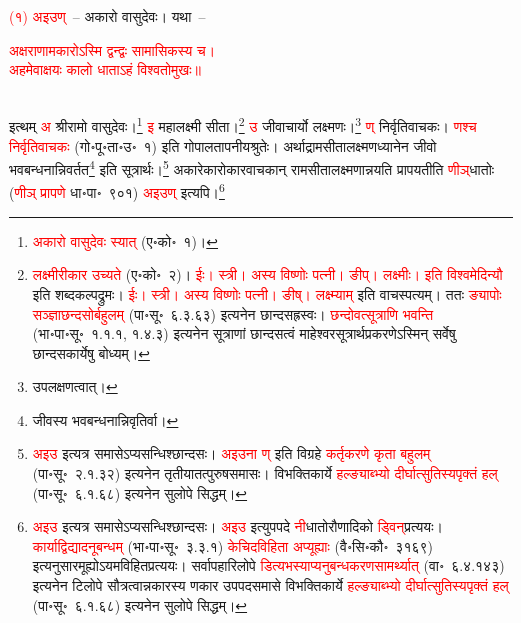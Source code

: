 \begin{sloppypar}\justifying\noindent\hspace{10mm} \textcolor{red}{(१) अइउण्}~– अकारो वासुदेवः। यथा~–\end{sloppypar}
\centering\textcolor{red}{अक्षराणामकारोऽस्मि द्वन्द्वः सामासिकस्य च।\nopagebreak\\
अहमेवाक्षयः कालो धाताऽहं विश्वतोमुखः॥}\nopagebreak\\
\\
\begin{sloppypar}\justifying\noindent इत्थम् \textcolor{red}{अ} श्रीरामो वासुदेवः।\footnote{\textcolor{red}{अकारो वासुदेवः स्यात्} (ए॰को॰~१)।} \textcolor{red}{इ} महालक्ष्मी सीता।\footnote{\textcolor{red}{लक्ष्मीरीकार उच्यते} (ए॰को॰~२)। \textcolor{red}{ईः। स्त्री। अस्य विष्णोः पत्नी। ङीप्। लक्ष्मीः। इति विश्वमेदिन्यौ} इति शब्दकल्पद्रुमः। \textcolor{red}{ईः। स्त्री। अस्य विष्णोः पत्नी। ङीष्। लक्ष्म्याम्} इति वाचस्पत्यम्। ततः \textcolor{red}{ङ्यापोः सञ्ज्ञा\-छन्दसोर्बहुलम्} (पा॰सू॰~६.३.६३) इत्यनेन छान्दस\-ह्रस्वः। \textcolor{red}{छन्दोवत्सूत्राणि भवन्ति} (भा॰पा॰सू॰~१.१.१, १.४.३) इत्यनेन सूत्राणां छान्दसत्वं माहेश्वर\-सूत्रार्थ\-प्रकरणेऽस्मिन् सर्वेषु छान्दस\-कार्येषु बोध्यम्।} \textcolor{red}{उ} जीवाचार्यो लक्ष्मणः।\footnote{उपलक्षणत्वात्।} \textcolor{red}{ण्} निर्वृति\-वाचकः। \textcolor{red}{णश्च निर्वृतिवाचकः} (गो॰पू॰ता॰उ॰~१) इति गोपाल\-तापनीय\-श्रुतेः। अर्थाद्राम\-सीता\-लक्ष्मण\-ध्यानेन जीवो भव\-बन्धनान्निवर्तत\footnote{जीवस्य भव\-बन्धनान्निवृतिर्वा।} इति सूत्रार्थः।\footnote{\textcolor{red}{अइउ} इत्यत्र समासेऽप्यसन्धिश्छान्दसः। \textcolor{red}{अइउना ण्} इति विग्रहे \textcolor{red}{कर्तृकरणे कृता बहुलम्‌} (पा॰सू॰~२.१.३२) इत्यनेन तृतीया\-तत्पुरुष\-समासः। विभक्तिकार्ये \textcolor{red}{हल्ङ्याब्भ्यो दीर्घात्सुतिस्यपृक्तं हल्} (पा॰सू॰~६.१.६८) इत्यनेन सुलोपे सिद्धम्।} अकारेकारोकार\-वाचकान् राम\-सीता\-लक्ष्मणान्नयति प्रापयतीति \textcolor{red}{णीञ्‌}\-धातोः (\textcolor{red}{णीञ् प्रापणे} धा॰पा॰~९०१) \textcolor{red}{अइउण्} इत्यपि।\footnote{\textcolor{red}{अइउ} इत्यत्र समासेऽप्यसन्धिश्छान्दसः। \textcolor{red}{अइउ} इत्युपपदे \textcolor{red}{नी}\-धातोरौणादिको \textcolor{red}{ड्विन्‌}\-प्रत्ययः। \textcolor{red}{कार्याद्विद्यादनूबन्धम्} (भा॰पा॰सू॰~३.३.१) \textcolor{red}{केचिदविहिता अप्यूह्याः} (वै॰सि॰कौ॰~३१६९) इत्यनुसारमूह्योऽ\-यमविहित\-प्रत्ययः। सर्वापहारि\-लोपे \textcolor{red}{डित्यभस्याप्यनु\-बन्धकरण\-सामर्थ्यात्} (वा॰~६.४.१४३) इत्यनेन टिलोपे सौत्रत्वान्नकारस्य णकार उपपद\-समासे विभक्तिकार्ये \textcolor{red}{हल्ङ्याब्भ्यो दीर्घात्सुतिस्यपृक्तं हल्} (पा॰सू॰~६.१.६८) इत्यनेन सुलोपे सिद्धम्।}\end{sloppypar}
